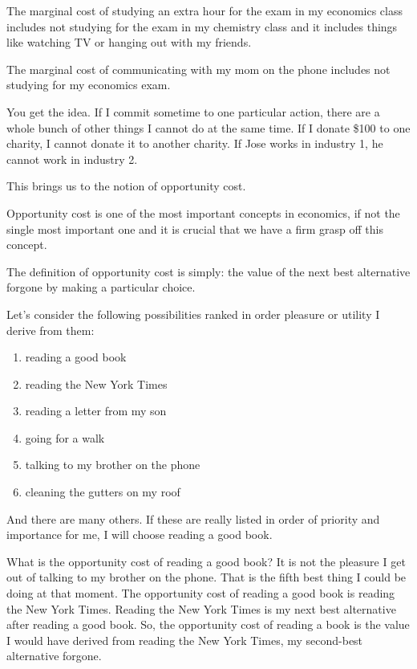\documentclass[
]{book}
\providecommand{\tightlist}{%
  \setlength{\itemsep}{0pt}\setlength{\parskip}{0pt}}
\begin{document}
The marginal cost of studying an extra hour for the exam in my economics class includes not studying for the exam in my chemistry class and it includes things like watching TV or hanging out with my friends.

The marginal cost of communicating with my mom on the phone includes not studying for my economics exam.

You get the idea. If I commit sometime to one particular action, there are a whole bunch of other things I cannot do at the same time. If I donate \$100 to one charity, I cannot donate it to another charity. If Jose works in industry 1, he cannot work in industry 2.

This brings us to the notion of opportunity cost.

Opportunity cost is one of the most important concepts in economics, if not the single most important one and it is crucial that we have a firm grasp off this concept.

The definition of opportunity cost is simply: the value of the next best alternative forgone by making a particular choice.

Let's consider the following possibilities ranked in order pleasure or utility I derive from them:

\begin{enumerate}
\def\labelenumi{\arabic{enumi}.}
\tightlist
\item
  reading a good book
\item
  reading the New York Times
\item
  reading a letter from my son
\item
  going for a walk
\item
  talking to my brother on the phone
\item
  cleaning the gutters on my roof
\end{enumerate}

And there are many others. If these are really listed in order of priority and importance for me, I will choose reading a good book.

What is the opportunity cost of reading a good book? It is not the pleasure I get out of talking to my brother on the phone. That is the fifth best thing I could be doing at that moment. The opportunity cost of reading a good book is reading the New York Times. Reading the New York Times is my next best alternative after reading a good book. So, the opportunity cost of reading a book is the value I would have derived from reading the New York Times, my second-best alternative forgone.
\end{document}
